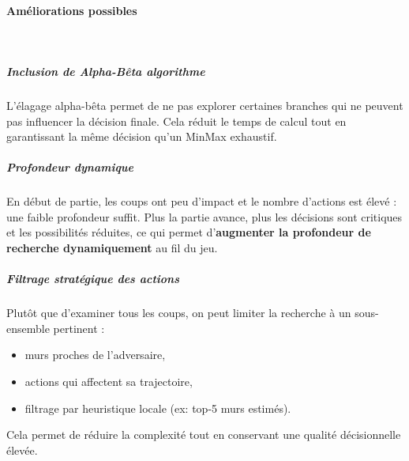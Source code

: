 \paragraph{Améliorations possibles} \\

\subparagraph{Inclusion de Alpha-Bêta algorithme }

L’élagage alpha-bêta permet de ne pas explorer certaines branches qui ne peuvent pas influencer la décision finale. Cela réduit le temps de calcul tout en garantissant la même décision qu’un MinMax exhaustif.

\subparagraph{Profondeur dynamique}

En début de partie, les coups ont peu d'impact et le nombre d’actions est élevé : une faible profondeur suffit. Plus la partie avance, plus les décisions sont critiques et les possibilités réduites, ce qui permet d’\textbf{augmenter la profondeur de recherche dynamiquement} au fil du jeu.

\subparagraph{Filtrage stratégique des actions}

Plutôt que d'examiner tous les coups, on peut limiter la recherche à un sous-ensemble pertinent :
\begin{itemize}
    \item murs proches de l’adversaire,
    \item actions qui affectent sa trajectoire,
    \item filtrage par heuristique locale (ex: top-5 murs estimés).
\end{itemize}

Cela permet de réduire la complexité tout en conservant une qualité décisionnelle élevée.